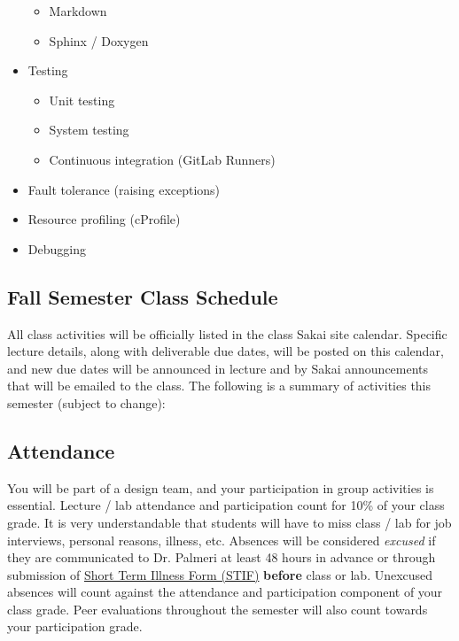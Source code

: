\begin{multicols}{2}
\begin{itemize}
\begin{itemize}
        \item Markdown
        \item Sphinx / Doxygen
    \end{itemize}
    \item Testing
    \begin{itemize}
        \item Unit testing
        \item System testing
        \item Continuous integration (GitLab Runners)
    \end{itemize}
    \item Fault tolerance (raising exceptions)
    \item Resource profiling (cProfile)
    \item Debugging
\end{itemize}
\end{multicols}

\subsection*{Fall Semester Class Schedule} 
All class activities will be officially listed in the class Sakai site
calendar.  Specific lecture details, along with deliverable due dates,
will be posted on this calendar, and new due dates will be announced in lecture
and by Sakai announcements that will be emailed to the class.  The following is
a summary of activities this semester (subject to change):



\subsection*{Attendance}
You will be part of a design team, and your participation in group activities
is essential.  Lecture / lab attendance and participation count for 10\% of
your class grade.  It is very understandable that students will have to miss
class / lab for job interviews, personal reasons, illness, etc.  Absences will
be considered \emph{excused} if they are communicated to Dr. Palmeri at least
48 hours in advance or through submission of
\href{http://www.pratt.duke.edu/undergrad/policies/3531}{Short Term Illness
    Form (STIF)} {\bf before} class or lab.  Unexcused absences will count
against the attendance and participation component of your class grade.  Peer
evaluations throughout the semester will also count towards your participation
grade.

